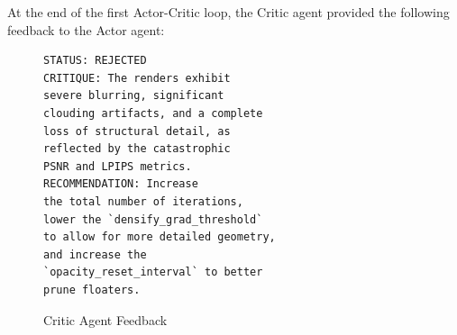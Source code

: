 \begin{table}[h!]
\centering
\caption{Sanity Check Training Configurations per Agentic Loop}
\label{tab:sanity-check-config}
\end{table}

\noindent At the end of the first Actor-Critic loop, the Critic agent provided the following feedback to the Actor agent: \\

\noindent{}
\begin{figure}[h]
\centering
\begin{verbatim}
STATUS: REJECTED
CRITIQUE: The renders exhibit 
severe blurring, significant 
clouding artifacts, and a complete 
loss of structural detail, as 
reflected by the catastrophic 
PSNR and LPIPS metrics.
RECOMMENDATION: Increase 
the total number of iterations, 
lower the `densify_grad_threshold` 
to allow for more detailed geometry, 
and increase the 
`opacity_reset_interval` to better 
prune floaters.
\end{verbatim}
\caption{Critic Agent Feedback}
\label{fig:critic-agent-feedback}
\end{figure}

